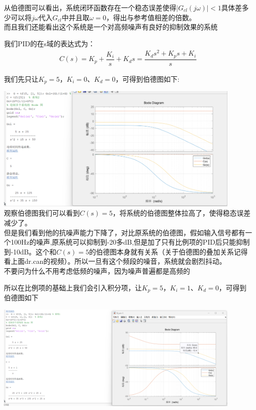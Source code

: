 \documentclass[UTF8,a4paper,12pt]{ctexart}
\begin{document}
\begin{notitlebox}
\begin{flushleft}
      \end{flushleft}
      \begin{flushleft}
        从伯德图可以看出，系统闭环函数存在一个稳态误差使得$|G_{cl}(j\omega)|<1$具体差多少可以将$j\omega$代入$G_{cl}$中并且取$\omega=0$，得出与参考值相差的倍数。\\
        而且我们还能看出这个系统是一个对高频噪声有良好的抑制效果的系统
        
      \end{flushleft}
      \begin{flushleft}
        我们PID的在s域的表达式为：
        \begin{align*}
          C(s)=K_p+\dfrac{K_i}{s}+K_ds=\dfrac{K_ds^2+K_ps+K_i}{s}
        \end{align*}
      \end{flushleft}
      \begin{flushleft}
        我们先只让$K_p=5$，$K_i=0$、$K_d=0$，可得到伯德图如下:
        \par \includegraphics[width=12cm]{picture/C_5.png}\\
        观察伯德图我们可以看到$C(s)=5$，将系统的伯德图整体拉高了，使得稳态误差减少了。\\
        但是我们看到他的抗噪声能力下降了，对比原系统的伯德图，假如输入信号都有一个100Hz的噪声,原系统可以抑制到-20多dB,但是加了只有比例项的PID后只能抑制到-10dB。这个和$C(s)=5$的伯德图本身就有关系（关于伯德图的叠加关系记得看上面dr.can的视频）。所以一旦有这个频段的噪音，系统就会剧烈抖动。\\{\scriptsize 不要问为什么不用考虑低频的噪声，因为噪声普遍都是高频的}
      \end{flushleft}
      \vspace{2cm}
      \begin{flushleft}
        所以在比例项的基础上我们会引入积分项，让$K_p=5$，$K_i=1$、$K_d=0$，可得到伯德图如下
        \par \includegraphics[width=12cm]{picture/C_5_I_1.png}

\end{flushleft}
\end{notitlebox}
\end{document}
